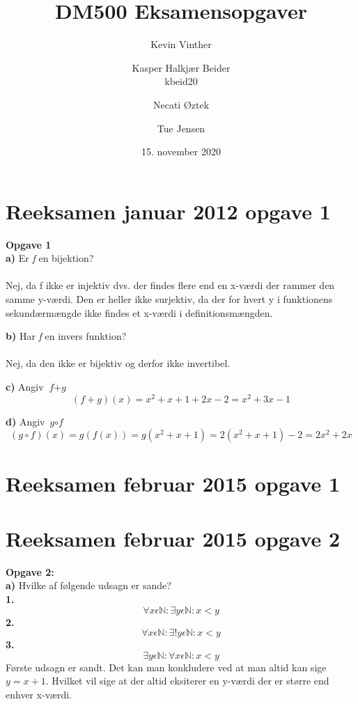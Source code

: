\documentclass{article}
\title{DM500 Eksamensopgaver}
\author{ Kevin Vinther \and Kasper Halkjær Beider\\kbeid20 \and Necati Øztek \and Tue Jensen}
\date{15. november 2020}
\begin{document}
\maketitle

\newpage

\section{Reeksamen januar 2012 opgave 1}
\textbf{Opgave 1}\\

\textbf{a)} Er \textit{f} en bijektion?\\
\\Nej, da f ikke er injektiv dvs. der findes flere end en x-værdi der rammer den samme y-værdi. Den er heller ikke surjektiv, da der for hvert y i funktionens sekundærmængde ikke findes et x-værdi i definitionsmængden.

\textbf{b)} Har \textit{f} en invers funktion?\\
\\Nej, da den ikke er bijektiv og derfor ikke invertibel.

\textbf{c)} Angiv $\textit{f} + \textit{g}$
\[(f+g)(x)=x^2+x+1+2x-2=x^2+3x-1\]

\textbf{d)} Angiv $\textit{g} \circ \textit{f}$
\[(g \circ f)(x)=g(f(x))=g(x^2+x+1)=2(x^2+x+1)-2=2x^2+2x\]
\section{Reeksamen februar 2015 opgave 1}

\section{Reeksamen februar 2015 opgave 2}

\textbf{Opgave 2:}\\
\textbf{a)} Hvilke af følgende udsagn er sande?\\
\textbf{1.} 
\begin{displaymath}
\forall x \epsilon \mathbb{N}: \exists y \epsilon \mathbb{N}: x<y
\end{displaymath}
\textbf{2.}\begin{displaymath}
\forall x \epsilon \mathbb{N}: \exists !y \epsilon \mathbb{N}: x<y
\end{displaymath}
\textbf{3.}\begin{displaymath}
\exists y  \epsilon \mathbb{N}: \forall x  \epsilon  \mathbb{N}: x<y
\end{displaymath}
Første udsagn er sandt. Det kan man konkludere ved at man altid kan sige \(y = x + 1\). Hvilket vil sige at der altid eksiterer en y-værdi der er større end enhver x-værdi. 
\end{document}
